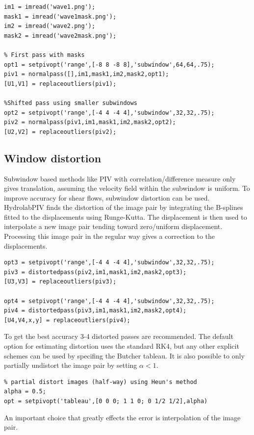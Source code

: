 \documentclass[10pt]{article}
\begin{document}
\begin{lstlisting}[caption=Shallow water wave]
% Read in wave images
im1 = imread('wave1.png');
mask1 = imread('wave1mask.png');
im2 = imread('wave2.png');
mask2 = imread('wave2mask.png');
  
% First pass with masks
opt1 = setpivopt('range',[-8 8 -8 8],'subwindow',64,64,.75);
piv1 = normalpass([],im1,mask1,im2,mask2,opt1); 
[U1,V1] = replaceoutliers(piv1);
 
%Shifted pass using smaller subwindows
opt2 = setpivopt('range',[-4 4 -4 4],'subwindow',32,32,.75);
piv2 = normalpass(piv1,im1,mask1,im2,mask2,opt2);
[U2,V2] = replaceoutliers(piv2);
\end{lstlisting}
\subsection{Window distortion} 
Subwindow based methods like PIV with correlation/difference measure only gives translation,
assuming the velocity field within the subwindow is uniform. To improve accuracy for shear flows,
subwindow distortion \citep{Scarano2002} can be used.
HydrolabPIV finds the distortion of the image pair by
integrating the B-splines fitted to the displacements using Runge-Kutta.
The displacement is then used to interpolate a new image pair tending toward zero/uniform displacement.
Processing this image pair in the regular way gives a correction to the displacements.
%
\begin{lstlisting}[caption=Shallow water wave (continued)]
% Distorted passes
opt3 = setpivopt('range',[-4 4 -4 4],'subwindow',32,32,.75);
piv3 = distortedpass(piv2,im1,mask1,im2,mask2,opt3);
[U3,V3] = replaceoutliers(piv3);
 
opt4 = setpivopt('range',[-4 4 -4 4],'subwindow',32,32,.75);
piv4 = distortedpass(piv3,im1,mask1,im2,mask2,opt4);
[U4,V4,x,y] = replaceoutliers(piv4);                
\end{lstlisting}
% 
To get the best accuracy 3-4 distorted passes are recommended.
%
The default option for estimating distortion uses the standard RK4,
but any other explicit schemes can be used by specifing the Butcher tableau. 
It is also possible to only partially undistort the image pair by setting $\alpha<1$.
\begin{lstlisting}
% partial distort images (half-way) using Heun's method
alpha = 0.5;
opt = setpivopt('tableau',[0 0 0; 1 1 0; 0 1/2 1/2],alpha) 
\end{lstlisting}
An important choice that greatly effects the error is interpolation of the image pair.
\end{document}
